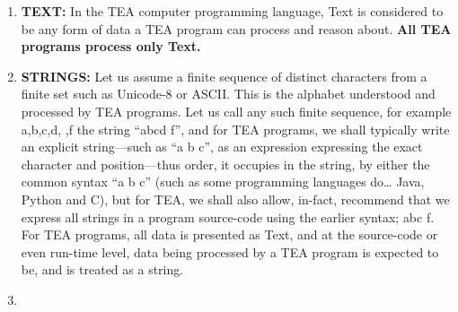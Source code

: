 \documentclass[a4paper, 18pt]{book} %
\begin{document}
\begin{enumerate}
\item{ \textbf{TEXT:} In the TEA computer programming language, Text is considered to be any form of data a TEA program can process and reason about. \textbf{All TEA programs process only Text.}}
\item{ 
\textbf{STRINGS:} Let us assume a finite sequence of distinct characters from a finite set such as Unicode-8 or ASCII. This is the alphabet understood and processed by TEA programs. Let us call any such finite sequence, for example {a,b,c,d, ,f} the string “abcd f”, and for TEA programs, we shall typically write an explicit string---such as “a b c”, as an expression expressing the exact character and position---thus order, it occupies in the string, by either the common syntax “a b c” (such as some programming languages do… Java, Python and C), but for TEA, we shall also allow, in-fact, recommend that we express all strings in a program source-code using the earlier syntax; {abc f}. For TEA programs, all data is presented as Text, and at the source-code or even run-time level, data being processed by a TEA program is expected to be, and is treated as a string.
}
\item{
}
\end{enumerate}
\end{document}
